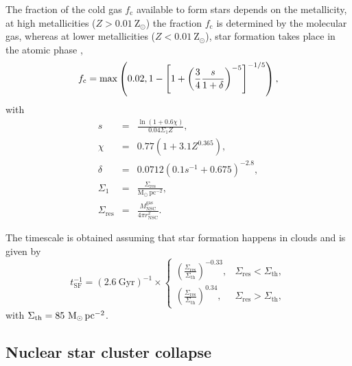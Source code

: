 \documentclass[baaa]{baaa}
\begin{document}
The fraction of the cold gas $f_\mathrm{c}$ available to form stars depends on the metallicity, at high metallicities  ($Z> 0.01~\mathrm{Z}_\odot$)  the fraction $f_\mathrm{c}$ is determined by the molecular gas, whereas at lower metallicities ($Z < 0.01~\mathrm{Z}_\odot$), star formation takes place in the atomic phase \citep{KRUMHOLZ2012}, 
\begin{equation}
f_\mathrm{c} = {\rm max}\left(0.02,1- \left[1+\left( \frac{3}{4} \frac{s}{1+\delta} \right)^{-5} \right]^{-1/5}\right),
\end{equation}
with 
\begin{eqnarray}
s  &=& \frac{\ln{(1+0.6\chi)}}{0.04\Sigma_1Z}, \\
\chi &=& 0.77(1+3.1Z^{0.365}),\\
\delta &=& 0.0712(0.1s^{-1}+0.675)^{-2.8},\\
\Sigma_1 &=& \frac{\Sigma_\mathrm{res}}{\mathrm{M}_\odot\,\mathrm{pc}^{-2}},\\
\Sigma_\mathrm{res} &=& \frac{M_\mathrm{NSC}^\mathrm{gas}}{4\pi r_\mathrm{NSC}^{2}}.
\end{eqnarray}


The timescale is obtained assuming that star formation happens in clouds \citep{KRUMHOLZ2009,SESANA2014,ANTONINI2015} and is given by
\begin{equation}
t_\mathrm{SF}^{-1} = (2.6~\mathrm{Gyr})^{-1} \times \begin{cases}
\left( \frac{ \Sigma_\mathrm{res}}{\Sigma_\mathrm{th}}\right)^{-0.33},& \Sigma_\mathrm{res} <\Sigma_\mathrm{th},\\
\left( \frac {\Sigma_\mathrm{res}}{\Sigma_\mathrm{th}}\right)^{0.34},& \Sigma_\mathrm{res} >\Sigma_\mathrm{th},
\end{cases}
\end{equation}
with $\Sigma_\mathrm{th}=85~{\rm M}_\odot\,\mathrm{pc}^{-2}$.


\subsection{Nuclear star cluster collapse}
\end{document}
